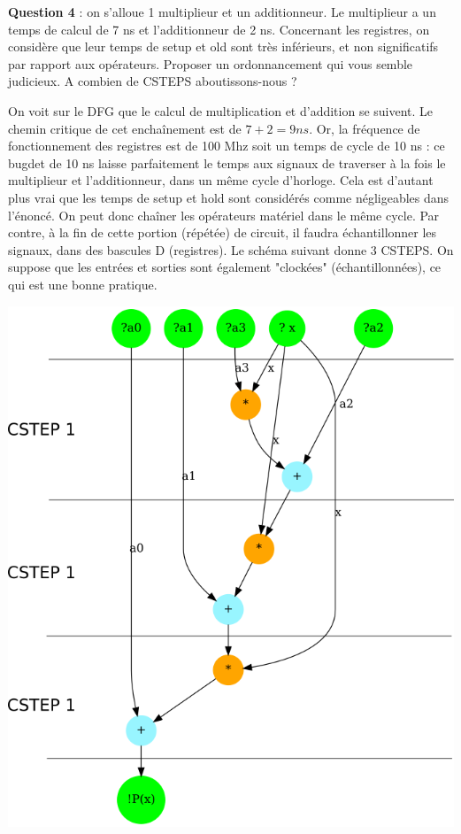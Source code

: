\documentclass[a4paper,11pt]{exam}
\begin{document}
\begin{questions}
  \question \textbf{Question 4} : on s'alloue 1 multiplieur et un additionneur. Le multiplieur a un temps de calcul de 7 ns et l'additionneur de 2 ns. Concernant les registres, on considère que leur temps de setup et old sont très inférieurs, et non significatifs par rapport aux opérateurs.  Proposer un ordonnancement qui vous semble judicieux. A combien de CSTEPS aboutissons-nous ?

  \begin{solution}
    On voit sur le DFG que le calcul de multiplication et d'addition se suivent. Le chemin critique de cet enchaînement est de $7+2=9 ns$. Or, la fréquence de fonctionnement des registres est de 100 Mhz soit un temps de cycle de 10 ns : ce bugdet de 10 ns laisse parfaitement le temps aux signaux de traverser à la fois le multiplieur et l'additionneur, dans un même cycle d'horloge. Cela est d'autant plus vrai que les temps de setup et hold sont considérés comme négligeables dans l'énoncé. On peut donc chaîner les opérateurs matériel dans le même cycle. Par contre, à la fin de cette portion (répétée) de circuit, il faudra échantillonner les signaux, dans des bascules D (registres). Le schéma suivant donne 3 CSTEPS. On suppose que les entrées et sorties sont également "clockées" (échantillonnées), ce qui est une bonne pratique.
    \begin{center}
      \includegraphics[scale=0.5]{dfg_horner_sched.png}
    \end{center}
  \end{solution}



\end{questions}
\end{document}
